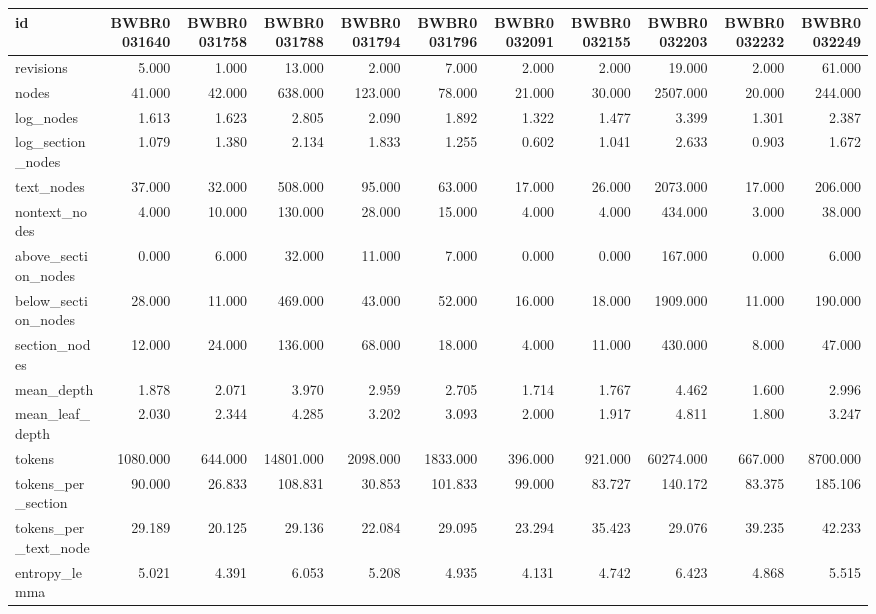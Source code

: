 \begin{tabular}{lrrrrrrrrrr}
\toprule
id & BWBR0031640 & BWBR0031758 & BWBR0031788 & BWBR0031794 & BWBR0031796 & BWBR0032091 & BWBR0032155 & BWBR0032203 & BWBR0032232 & BWBR0032249 \\
\midrule
revisions & 5.000 & 1.000 & 13.000 & 2.000 & 7.000 & 2.000 & 2.000 & 19.000 & 2.000 & 61.000 \\
\cline{1-11}
nodes & 41.000 & 42.000 & 638.000 & 123.000 & 78.000 & 21.000 & 30.000 & 2507.000 & 20.000 & 244.000 \\
\cline{1-11}
log\_nodes & 1.613 & 1.623 & 2.805 & 2.090 & 1.892 & 1.322 & 1.477 & 3.399 & 1.301 & 2.387 \\
\cline{1-11}
log\_section\_nodes & 1.079 & 1.380 & 2.134 & 1.833 & 1.255 & 0.602 & 1.041 & 2.633 & 0.903 & 1.672 \\
\cline{1-11}
text\_nodes & 37.000 & 32.000 & 508.000 & 95.000 & 63.000 & 17.000 & 26.000 & 2073.000 & 17.000 & 206.000 \\
\cline{1-11}
nontext\_nodes & 4.000 & 10.000 & 130.000 & 28.000 & 15.000 & 4.000 & 4.000 & 434.000 & 3.000 & 38.000 \\
\cline{1-11}
above\_section\_nodes & 0.000 & 6.000 & 32.000 & 11.000 & 7.000 & 0.000 & 0.000 & 167.000 & 0.000 & 6.000 \\
\cline{1-11}
below\_section\_nodes & 28.000 & 11.000 & 469.000 & 43.000 & 52.000 & 16.000 & 18.000 & 1909.000 & 11.000 & 190.000 \\
\cline{1-11}
section\_nodes & 12.000 & 24.000 & 136.000 & 68.000 & 18.000 & 4.000 & 11.000 & 430.000 & 8.000 & 47.000 \\
\cline{1-11}
mean\_depth & 1.878 & 2.071 & 3.970 & 2.959 & 2.705 & 1.714 & 1.767 & 4.462 & 1.600 & 2.996 \\
\cline{1-11}
mean\_leaf\_depth & 2.030 & 2.344 & 4.285 & 3.202 & 3.093 & 2.000 & 1.917 & 4.811 & 1.800 & 3.247 \\
\cline{1-11}
tokens & 1080.000 & 644.000 & 14801.000 & 2098.000 & 1833.000 & 396.000 & 921.000 & 60274.000 & 667.000 & 8700.000 \\
\cline{1-11}
tokens\_per\_section & 90.000 & 26.833 & 108.831 & 30.853 & 101.833 & 99.000 & 83.727 & 140.172 & 83.375 & 185.106 \\
\cline{1-11}
tokens\_per\_text\_node & 29.189 & 20.125 & 29.136 & 22.084 & 29.095 & 23.294 & 35.423 & 29.076 & 39.235 & 42.233 \\
\cline{1-11}
entropy\_lemma & 5.021 & 4.391 & 6.053 & 5.208 & 4.935 & 4.131 & 4.742 & 6.423 & 4.868 & 5.515 \\

\end{tabular}
